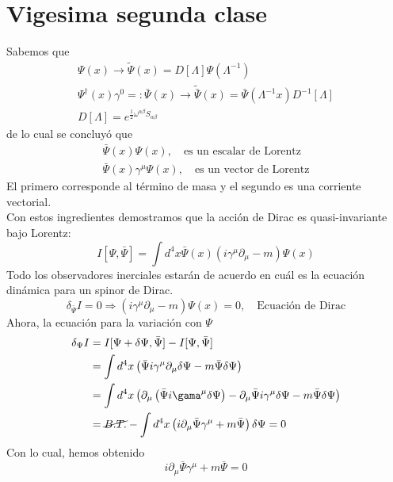 \documentclass[../main.tex]{subfiles}
\begin{document}
\section{Vigesima segunda clase}
Sabemos que
\begin{align*}
  \Psi(x) \rightarrow \tilde{\Psi}(x) = D[\Lambda] \Psi(\Lambda^{-1}) \\
  \Psi^\dagger (x) \gamma^0 = : \bar{\Psi}(x) \rightarrow \tilde{\bar{\Psi}}(x) = \bar{\Psi}(\Lambda^{-1}x) D^{-1}[\Lambda] \\
  D[\Lambda] = e^{\frac{1}{2}\omega^{\alpha \beta}S_{\alpha \beta}}
\end{align*}
de lo cual se concluyó que
\begin{align*}
  \bar{\Psi}(x)\Psi(x) , \quad \text{es un escalar de Lorentz} \\
  \bar{\Psi}(x) \gamma^\mu \Psi(x), \quad \text{es un vector de Lorentz}
\end{align*}
El primero corresponde al término de masa y el segundo es una corriente vectorial. \\
Con estos ingredientes demostramos que la acción de Dirac es quasi-invariante bajo Lorentz:
\begin{equation*}
  I[\Psi,\bar{\Psi}]= \int d^4x \bar{\Psi}(x) \left(i\gamma^\mu \partial_\mu - m \right)\Psi(x)
\end{equation*}
Todo los observadores inerciales estarán de acuerdo en cuál es la ecuación dinámica para un spinor de Dirac.
\begin{equation*}
  \delta_{\bar{\Psi}} I = 0 \Rightarrow \left( i\gamma^\mu \partial_\mu - m  \right)\Psi(x) = 0, \quad \text{Ecuación de Dirac}
\end{equation*}
Ahora, la ecuación para la variación con $\Psi$
\begin{align*}
  \delta_{\Psi} I & = I[\Psi+ \delta \Psi , \bar{\Psi}] - I [\Psi,\bar{\Psi}] \\
  & = \int d^4x \left( \bar{\Psi} i\gamma^\mu \partial_\mu \delta \Psi - m \bar{\Psi} \delta \Psi \right) \\
  & = \int d^4x \left( \partial_\mu \left( \bar{\Psi} i \gama^\mu \delta\Psi \right) - \partial_\mu \bar{\Psi} i \gamma^\mu \delta \Psi - m \bar{\Psi} \delta \Psi\right) \\
  & = \cancel{B.T.} - \int d^4x \left( i \partial_\mu \bar{\Psi} \gamma^\mu + m \bar{\Psi} \right)\delta \Psi  = 0 \\
\end{align*}
Con lo cual, hemos obtenido
\begin{equation}
  i\partial_\mu \bar{\Psi} \gamma^\mu + m\bar{\Psi} = 0  
 \end{equation}
\end{document}
